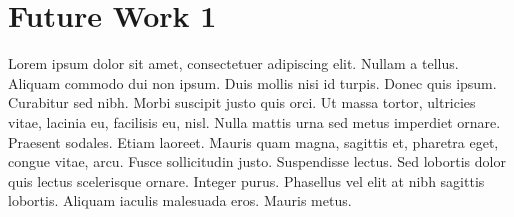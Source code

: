 \chapter{Future Work 1}
\label{c:futurework} Lorem ipsum dolor sit amet, consectetuer adipiscing elit.
Nullam a tellus. Aliquam commodo dui non ipsum. Duis mollis nisi id turpis.
Donec quis ipsum. Curabitur sed nibh. Morbi suscipit justo quis orci. Ut massa
tortor, ultricies vitae, lacinia eu, facilisis eu, nisl. Nulla mattis urna sed
metus imperdiet ornare. Praesent sodales. Etiam laoreet. Mauris quam magna,
sagittis et, pharetra eget, congue vitae, arcu. Fusce sollicitudin justo.
Suspendisse lectus. Sed lobortis dolor quis lectus scelerisque ornare. Integer
purus. Phasellus vel elit at nibh sagittis lobortis. Aliquam iaculis malesuada
eros. Mauris metus.

